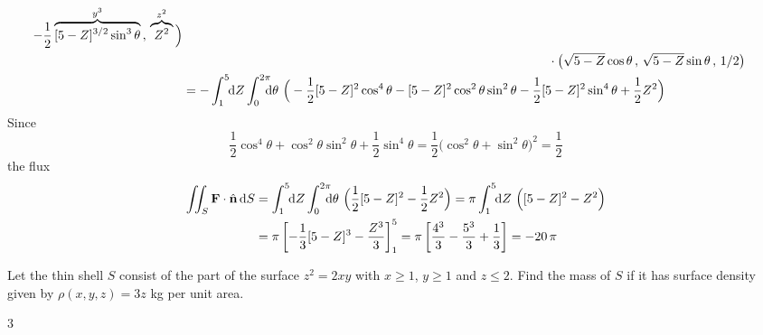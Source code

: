 \begin{solution}
\begin{align*}
         -\frac{1}{2}\overbrace{[5-Z]^{3/2}\sin^3\theta}^{y^3} \,,\, 
         \overbrace{Z^2}^{z^2}\Big) \\
&\hskip4in \cdot
    \big(\sqrt{5-Z}\cos\theta\,,\,\sqrt{5-Z}\sin\theta\,,\, 1/2\big) \\
&=-\int_1^5\hskip-3pt\dee{Z}\int_0^{2\pi}\hskip-6.5pt\dee{\theta}\ 
    \Big(-\frac{1}{2}[5-Z]^2\cos^4\theta
           - [5-Z]^2\cos^2\theta\sin^2\theta 
         -\frac{1}{2}[5-Z]^2\sin^4\theta  
         +\frac{1}{2}Z^2\Big)
\end{align*}
Since 
\begin{equation*}
\frac{1}{2}\cos^4\theta + \cos^2\theta\sin^2\theta +\frac{1}{2}\sin^4\theta 
=\frac{1}{2}\big(\cos^2\theta+\sin^2\theta\big)^2=\frac{1}{2}
\end{equation*}
the flux
\begin{align*}
\dblInt_S \vF\cdot\hn\,\dee{S}
&=\int_1^5\hskip-3pt\dee{Z}\int_0^{2\pi}\hskip-6.5pt\dee{\theta}\ 
    \Big(\frac{1}{2}[5-Z]^2 -\frac{1}{2} Z^2\Big)
=\pi \int_1^5\hskip-3pt\dee{Z}\ \Big([5-Z]^2 -Z^2\Big) \\
&=\pi\left[-\frac{1}{3}[5-Z]^3 - \frac{Z^3}{3}\right]_1^5
=\pi \left[\frac{4^3}{3}-\frac{5^3}{3}+\frac{1}{3}\right]
=-20\,\pi
\end{align*}
\end{solution}


\begin{question}[M317 2003A] %
Let the thin shell $S$ consist of the part of the surface $z^2=2xy$
with $x\ge 1$, $y\ge 1$ and $z\le 2$. Find the mass of $S$ if it has surface
density given by $\rho(x,y,z)=3z$ kg per unit area.
\end{question}


\begin{answer} 
$3$
\end{answer}

